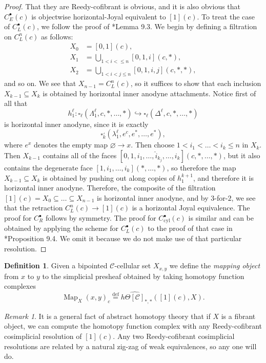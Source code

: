 \documentclass[a4paper]{article}
\numberwithin{equation}{subsection}
\theoremstyle{plain}   %
\theoremstyle{definition}
\newtheorem{defn}[equation]{Definition}
\theoremstyle{remark}
\newtheorem{rem}[equation]{Remark}
\theoremstyle{plain}
\DeclareMathOperator{\Map}{Map}
\providecommand{\C}{}
\renewcommand{\C}{\ensuremath{\mathcal{C}}}
\newcommand{\defeq}{\overset{\mathrm{def}}=}
\newcommand{\cellset}{\ensuremath{\widehat{\Theta[\mathcal{C}]}}}
\begin{document}
\begin{proof}
	That they are Reedy-cofibrant is obvious, and it is also obvious that \(C^\bullet_E(c)\) is objectwise horizontal-Joyal equivalent to \([1](c)\). 	To treat the case of \(C^\bullet_L(c)\), we follow the proof of \cite{ds2}*{Lemma 9.3}. We begin by defining a filtration on \(C^n_L(c)\) as follows: 
	\begin{align*}
		X_0 &= [0,1](c), \\
		X_1 &= \bigcup_{1< i <\leq n} [0,1,i](c,\ast), \\
		X_2 &= \bigcup_{1< i < j \leq n} [0,1,i,j](c,\ast,\ast),  
	\end{align*}
	and so on.  We see that \(X_{n-1}=C^n_L(c)\), so it suffices to show that each inclusion \(X_{k-1} \subseteq X_{k}\) is obtained by horizontal inner anodyne attachments.  Notice first of all that 
	\[h^\ell_1:\square_\ell(\Lambda^\ell_1,c,\ast,\dots,\ast)\hookrightarrow \square_\ell(\Delta^\ell,c,\ast,\dots,\ast)\] is horizontal inner anodyne, since it is exactly \[\square^\lrcorner_k(\lambda^\ell_1,e^{c},e^\ast,\dots,e^\ast),\] where \(e^x\) denotes the empty map \(\varnothing \to x\).
	Then choose \(1< i_1 < \dots < i_k \leq n\) in \(X_k\).  Then \(X_{k-1}\) contains all of the faces \([0,1,i_1,\dots, \hat{i}_{k_j},\dots,i_k](c,\ast,\dots,\ast)\), but it also contains the degenerate face \([1,i_1,\dots,i_k](\ast,\dots,\ast)\), so therefore the map \(X_{k-1} \subseteq X_k\) is obtained by pushing out along copies of \(h^{k+1}_1\), and therefore it is horizontal inner anodyne.  Therefore, the composite of the filtration \([1](c)=X_0 \subseteq \dots \subseteq X_{n-1}\) is horizontal inner anodyne, and by \(3\)-for-\(2\), we see that the retraction \(C^n_L(c) \to [1](c)\) is a horizontal Joyal equivalence.  The proof for \(C^\bullet_R\) follows by symmetry. 
	The proof for \(C^\bullet_{\mathrm{cyl}}(c)\) is similar and can be obtained by applying the scheme for \(C^\bullet_L(c)\) to the proof of that case in \cite{ds2}*{Proposition 9.4}. We omit it because we do not make use of that particular resolution.
\end{proof}

\begin{defn}
	Given a bipointed \(\C\)-cellular set \(X_{x,y}\) we define the \emph{mapping object} from \(x\) to \(y\) to the simplicial presheaf obtained by taking homotopy function complexes
	\[\Map_X(x,y)_c\defeq h\cellset_{\ast,\ast}([1](c), X).\]
\end{defn}
\begin{rem}
	It is a general fact of abstract homotopy theory that if \(X\) is a fibrant object, we can compute the homotopy function complex with any Reedy-cofibrant cosimplicial resolution of \([1](c)\).  Any two Reedy-cofibrant cosimplicial resolutions are related by a natural zig-zag of weak equivalences, so any one will do.
\end{rem}
\end{document}
